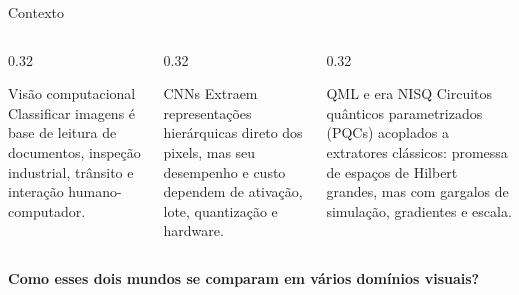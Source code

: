 \documentclass[aspectratio=169,11pt,brazil]{beamer}
\begin{document}
\begin{frame}{Contexto}
  \begin{columns}[T]
    \begin{column}{0.32\textwidth}
      \begin{block}{Visão computacional}
        Classificar imagens é base de leitura de documentos, inspeção industrial, trânsito e interação humano-computador.
      \end{block}
    \end{column}
    \begin{column}{0.32\textwidth}
      \begin{block}{CNNs}
        Extraem representações hierárquicas direto dos pixels, mas seu desempenho e custo dependem de ativação, lote, quantização e hardware.
      \end{block}
    \end{column}
    \begin{column}{0.32\textwidth}
      \begin{block}{QML e era NISQ}
        Circuitos quânticos parametrizados (PQCs) acoplados a extratores clássicos: promessa de espaços de Hilbert grandes, mas com gargalos de simulação, gradientes e escala.
      \end{block}
    \end{column}
  \end{columns}
  \vspace{0.3cm}
  \centering
  \Large\color{senacblue}\textbf{Como esses dois mundos se comparam em vários domínios visuais?}
\end{frame}
\end{document}
